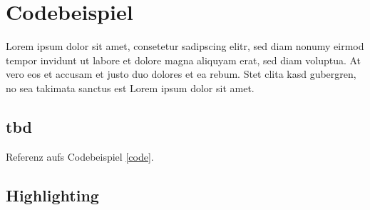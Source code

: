 
\chapter{Codebeispiel}

Lorem ipsum dolor sit amet, consetetur sadipscing elitr, sed diam nonumy eirmod tempor invidunt ut labore et dolore magna aliquyam erat, sed diam voluptua. At vero eos et accusam et justo duo dolores et ea rebum. Stet clita kasd gubergren, no sea takimata sanctus est Lorem ipsum dolor sit amet.

\section{tbd} 


Referenz aufs Codebeispiel \ref{code}.



\section{Highlighting}

